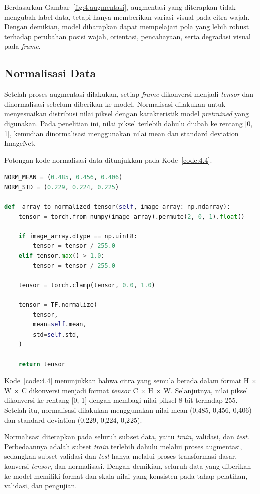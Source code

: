 Berdasarkan Gambar~\ref{fig:4.augmentasi}, augmentasi yang diterapkan tidak mengubah label data, tetapi hanya memberikan variasi visual pada citra wajah. Dengan demikian, model diharapkan dapat mempelajari pola yang lebih robust terhadap perubahan posisi wajah, orientasi, pencahayaan, serta degradasi visual pada \textit{frame}.

\subsection{Normalisasi Data} \label{IV.Normalisasi}
Setelah proses augmentasi dilakukan, setiap \textit{frame} dikonversi menjadi \textit{tensor} dan dinormalisasi sebelum diberikan ke model. Normalisasi dilakukan untuk menyesuaikan distribusi nilai piksel dengan karakteristik model \textit{pretrained} yang digunakan. Pada penelitian ini, nilai piksel terlebih dahulu diubah ke rentang [0, 1], kemudian dinormalisasi menggunakan nilai mean dan standard deviation ImageNet.

Potongan kode normalisasi data ditunjukkan pada Kode~\ref{code:4.4}.

\begin{lstlisting}[language=Python, caption={Normalisasi Data}, label={code:4.4}]
NORM_MEAN = (0.485, 0.456, 0.406)
NORM_STD = (0.229, 0.224, 0.225)

def _array_to_normalized_tensor(self, image_array: np.ndarray):
	tensor = torch.from_numpy(image_array).permute(2, 0, 1).float()

	if image_array.dtype == np.uint8:
		tensor = tensor / 255.0
	elif tensor.max() > 1.0:
		tensor = tensor / 255.0

	tensor = torch.clamp(tensor, 0.0, 1.0)

	tensor = TF.normalize(
		tensor,
		mean=self.mean,
		std=self.std,
	)

	return tensor
\end{lstlisting}

Kode~\ref{code:4.4} menunjukkan bahwa citra yang semula berada dalam format H $\times$ W $\times$ C dikonversi menjadi format \textit{tensor} C $\times$ H $\times$ W. Selanjutnya, nilai piksel dikonversi ke rentang [0, 1] dengan membagi nilai piksel 8-bit terhadap 255. Setelah itu, normalisasi dilakukan menggunakan nilai mean (0,485, 0,456, 0,406) dan standard deviation (0,229, 0,224, 0,225).

Normalisasi diterapkan pada seluruh subset data, yaitu \textit{train}, validasi, dan \textit{test}. Perbedaannya adalah subset \textit{train} terlebih dahulu melalui proses augmentasi, sedangkan subset validasi dan \textit{test} hanya melalui proses transformasi dasar, konversi \textit{tensor}, dan normalisasi. Dengan demikian, seluruh data yang diberikan ke model memiliki format dan skala nilai yang konsisten pada tahap pelatihan, validasi, dan pengujian.

